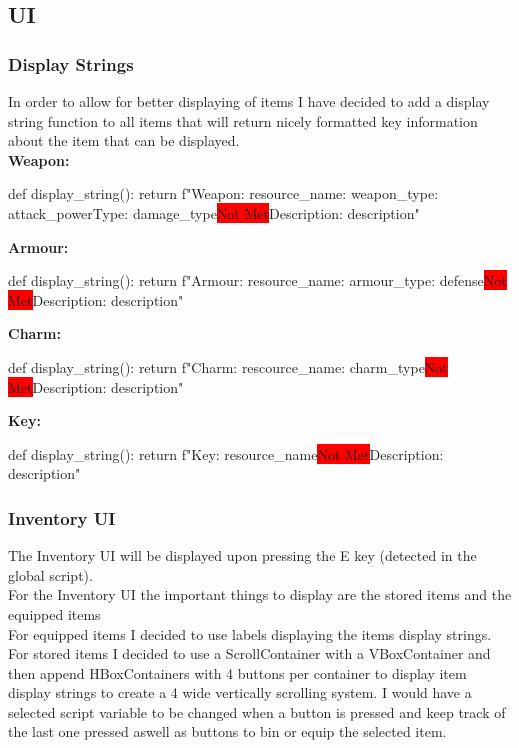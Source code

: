 \documentclass{article}
\newcommand{\red}[1]{\colorbox{red}{#1}}
\newcommand{\n}[0]{\red{Not Met}}
\begin{document}
        \subsection{UI}
        \subsubsection{Display Strings}
        In order to allow for better displaying of items I have decided to add a display string function to all items that will return nicely formatted key information about the item that can be displayed.\\
        \textbf{Weapon:}\\
        \begin{python}
def display_string():
   return f"Weapon\nName: {resource_name}\nType: {weapon_type}\nDamage: {attack_power}\nDamage Type: {damage_type}\n Description: {description}"
        \end{python}
        \textbf{Armour:}\\
        \begin{python}
def display_string():
   return f"Armour\nName: {resource_name}\nType: {armour_type}\nDefense: {defense}\n Description: {description}"
        \end{python}
        \textbf{Charm:}\\
        \begin{python}
def display_string():
   return f"Charm\nName: {rescource_name}\nType: {charm_type}\n Description: {description}"
        \end{python}
        \textbf{Key:}\\
        \begin{python}
def display_string():
   return f"Key\nName: {resource_name}\n Description: {description}"
        \end{python}
        \subsubsection{Inventory UI}
        The Inventory UI will be displayed upon pressing the E key (detected in the global script).\\
        For the Inventory UI the important things to display are the stored items and the equipped items\\
        For equipped items I decided to use labels displaying the items display strings.\\
        For stored items I decided to use a ScrollContainer with a VBoxContainer and then append HBoxContainers with 4 buttons per container to display item display strings to create a 4 wide vertically scrolling system. I would have a selected script variable to be changed when a button is pressed and keep track of the last one pressed aswell as buttons to bin or equip the selected item.\\
\end{document}
